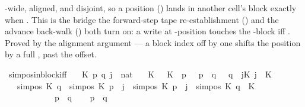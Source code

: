 \begin{isabellebody}
\begin{isamarkuptext}
  -wide, aligned, and disjoint, so a position
   () lands in another cell's
  block  exactly when
  .  This is the bridge the forward-step tape
  re-establishment () and the advance back-walk
  () both turn on: a write at -position
   touches the -block iff .
  Proved by the alignment argument — a block index off by one shifts
  the position by a full , past the 
  offset.%
\end{isamarkuptext}\isamarkuptrue%
\isamarkupfalse%
\ sim{\isacharunderscore}{\kern0pt}pos{\isacharunderscore}{\kern0pt}in{\isacharunderscore}{\kern0pt}block{\isacharunderscore}{\kern0pt}iff{\isacharcolon}{\kern0pt}\isanewline
\ \ \ K\ p\ q\ j\ {\isacharcolon}{\kern0pt}{\isacharcolon}{\kern0pt}\ nat\isanewline
\ \ \ K{}{\isacharcolon}{\kern0pt}\ {\isachardoublequoteopen}{}\ {\isasymle}\ K{\isachardoublequoteclose}\ \ p{}{\isacharcolon}{\kern0pt}\ {\isachardoublequoteopen}{}\ {\isasymle}\ p{\isachardoublequoteclose}\ \ q{}{\isacharcolon}{\kern0pt}\ {\isachardoublequoteopen}{}\ {\isasymle}\ q{\isachardoublequoteclose}\ \ jK{\isacharcolon}{\kern0pt}\ {\isachardoublequoteopen}j\ {\isacharless}{\kern0pt}\ K{\isachardoublequoteclose}\isanewline
\ \ \ {\isachardoublequoteopen}{\isacharparenleft}{\kern0pt}sim{\isacharunderscore}{\kern0pt}pos\ K\ q\ {\isasymle}\ sim{\isacharunderscore}{\kern0pt}pos\ K\ p\ {\isacharplus}{\kern0pt}\ j\ {\isasymand}\ sim{\isacharunderscore}{\kern0pt}pos\ K\ p\ {\isacharplus}{\kern0pt}\ j\ {\isacharless}{\kern0pt}\ sim{\isacharunderscore}{\kern0pt}pos\ K\ q\ {\isacharplus}{\kern0pt}\ K{\isacharparenright}{\kern0pt}\isanewline
\ \ \ \ \ \ \ \ \ \ \ {\isasymlongleftrightarrow}\ p\ {\isacharequal}{\kern0pt}\ q{\isachardoublequoteclose}\isanewline
%
\isadelimproof
%
\endisadelimproof
%
\isatagproof
{}\isamarkupfalse%
\isanewline
\ \ \isamarkupfalse%
\ {\isachardoublequoteopen}p\ {\isacharequal}{\kern0pt}\ q{\isachardoublequoteclose}\isanewline

\end{isabellebody}
